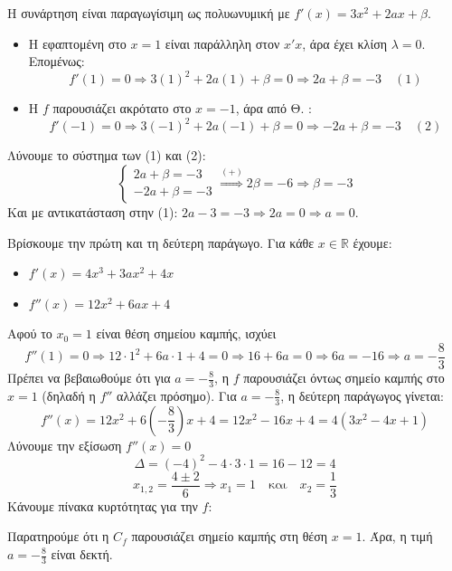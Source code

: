 \lysh
Η συνάρτηση είναι παραγωγίσιμη ως πολυωνυμική με $f'(x) = 3x^2 + 2ax + \beta$.
\begin{itemize}
    \item Η εφαπτομένη στο $x=1$ είναι παράλληλη στον $x'x$, άρα έχει κλίση $\lambda=0$. Επομένως:
    \[ f'(1) = 0 \Rightarrow 3(1)^2 + 2a(1) + \beta = 0 \Rightarrow 2a + \beta = -3 \quad (1) \]
    \item Η $f$ παρουσιάζει ακρότατο στο $x=-1$, άρα από Θ. :
    \[ f'(-1) = 0 \Rightarrow 3(-1)^2 + 2a(-1) + \beta = 0 \Rightarrow -2a + \beta = -3 \quad (2) \]
\end{itemize}
Λύνουμε το σύστημα των (1) και (2):
\[ \begin{cases} 2a+\beta=-3 \\ -2a+\beta=-3 \end{cases} \stackrel{(+)}{\Rightarrow} 2\beta = -6 \Rightarrow {\beta = -3} \]
Και με αντικατάσταση στην (1): $2a - 3 = -3 \Rightarrow 2a = 0 \Rightarrow {a = 0}$.\\


\lysh
Βρίσκουμε την πρώτη και τη δεύτερη παράγωγο. Για κάθε $x\in\mathbb{R}$ έχουμε:
\begin{itemize}
    \item $f'(x) = 4x^3 + 3ax^2 + 4x$
    \item $f''(x) = 12x^2 + 6ax + 4$
\end{itemize}
Αφού το $x_0=1$ είναι θέση σημείου καμπής, ισχύει 
\[f''(1) = 0\Rightarrow12\cdot1^2 + 6a\cdot1 + 4 = 0 \Rightarrow 16 + 6a = 0 \Rightarrow 6a = -16 \Rightarrow a = -\frac{8}{3} \]
Πρέπει να βεβαιωθούμε ότι για $a = -\frac{8}{3}$, η $f$ παρουσιάζει όντως σημείο καμπής στο $x=1$ (δηλαδή η $f''$ αλλάζει πρόσημο). Για $a = -\frac{8}{3}$, η δεύτερη παράγωγος γίνεται:
\[ f''(x) = 12x^2 + 6\left(-\frac{8}{3}\right)x + 4 = 12x^2 - 16x + 4 = 4(3x^2 - 4x + 1) \]
Λύνουμε την εξίσωση $f''(x)=0$
\[ \Delta = (-4)^2 - 4\cdot 3 \cdot 1 = 16 - 12 = 4 \]
\[ x_{1,2} = \frac{4 \pm 2}{6} \Rightarrow x_1 = 1 \quad \text{και} \quad x_2 = \frac{1}{3} \]
Κάνουμε πίνακα κυρτότητας για την $f$:
\begin{center}
\end{center}
Παρατηρούμε ότι η $C_f$ παρουσιάζει σημείο καμπής στη θέση $x=1$. Άρα, η τιμή ${a = -\frac{8}{3}}$ είναι {δεκτή}.\\

